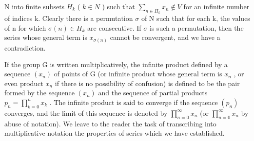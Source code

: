 N into finite subsets \(H_{k}\) ( \(k \in N\) ) such that \(\sum_{n \in H_{k}} x_{n} \notin V\) for an infinite number of indices k. Clearly there is a permutation \(\sigma\) of N such that for each k, the values of n for which \(\sigma(n) \in H_{k}\) are consecutive. If \(\sigma\) is such a permutation, then the series whose general term is \(x_{\sigma(n)}\) cannot be convergent, and we have a contradiction.

If the group G is written multiplicatively, the infinite product defined by a sequence \((x_{n})\) of points of G (or infinite product whose general term is \(x_{n}\) , or even product \(x_{n}\) if there is no possibility of confusion) is defined to be the pair formed by the sequence \((x_{n})\) and the sequence of partial products \(p_{n}=\prod_{k=0}^{n}x_{k}\) . The infinite product is said to converge if the sequence \((p_{n})\) converges, and the limit of this sequence is denoted by \(\prod_{n=0}^{\infty}x_{n}\) (or \(\prod_{n=0}^{\infty}x_{n}\) by abuse of notation). We leave to the reader the task of transcribing into multiplicative notation the properties of series which we have established.

